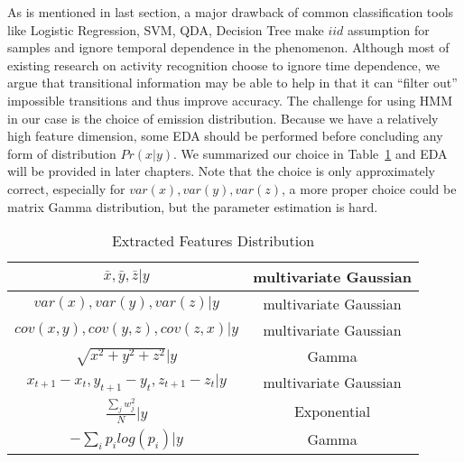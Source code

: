 As is mentioned in last section, a major drawback of common classification tools like Logistic Regression, SVM, QDA, Decision Tree make $iid$ assumption for samples and ignore temporal dependence in the phenomenon. Although most of existing research on activity recognition choose to ignore time dependence, we argue that transitional information may be able to help in that it can ``filter out'' impossible transitions and thus improve accuracy. The challenge for using HMM in our case is the choice of emission distribution. Because we have a relatively high feature dimension, some EDA should be performed before concluding any form of distribution $Pr(x|y)$. We summarized our choice in Table~\ref{table:distribution} and EDA will be provided in later chapters. Note that the choice is only approximately correct, especially for $var(x),var(y),var(z)$, a more proper choice could be matrix Gamma distribution, but the parameter estimation is hard. 
\begin{table}
\begin{center}
\begin{tabular}{c|c
}
      \hline
      $\bar{x},\bar{y},\bar{z}|y$& multivariate Gaussian\\
      \hline
      $var(x),var(y),var(z)|y$ &  multivariate Gaussian\\
      \hline
      $cov(x,y),cov(y,z),cov(z,x)|y$& multivariate Gaussian\\
      \hline
      $\sqrt{x^2+y^2+z^2}|y$& Gamma\\
      \hline
      $x_{t+1}-x_{t},y_{t+1}-y_{t},z_{t+1}-z_{t}|y$ & multivariate Gaussian\\
      \hline
      $\frac{\sum_j w_j^2}{N}|y$& Exponential \\ \hline
      $ -\sum_i p_ilog(p_i)|y$ & Gamma \\
  \hline
\end{tabular}
\end{center}
\caption{Extracted Features Distribution}
\label{table:distribution}
\end{table}


